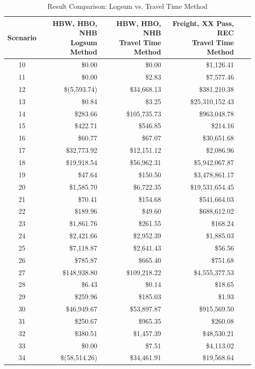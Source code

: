 \begin{table}

\caption{\label{tab:comparison} Result Comparison: Logsum vs. Travel Time Method}
\centering
\begin{tabular}[t]{crrrrr}
\toprule
Scenario & \makecell{HBW, HBO, NHB \\ Logsum Method} & \makecell{HBW, HBO, NHB\\ Travel Time Method} & \makecell{Freight, XX Pass, REC\\ Travel Time Method}\\
\midrule
10 & \$0.00 & \$0.00 & \$1,126.41\\
11 & \$0.00 & \$2.83 & \$7,577.46\\
12 & \$(5,593.74) & \$34,668.13 & \$381,210.38\\
13 & \$0.84 & \$3.25 & \$25,310,152.43\\
14 & \$283.66 & \$105,735.73 & \$963,048.78\\
15 & \$422.71 & \$546.85 & \$214.16\\
16 & \$60.77 & \$67.07 & \$30,651.68\\
17 & \$32,773.92 & \$12,151.12 & \$2,086.96\\
18 & \$19,918.54 & \$56,962.31 & \$5,942,067.87\\
19 & \$47.64 & \$150.50 & \$3,478,861.17\\
20 & \$1,585.70 & \$6,722.35 & \$19,531,654.45\\
21 & \$70.41 & \$154.68 & \$541,664.03\\
22 & \$189.96 & \$49.60 & \$688,612.02\\
23 & \$1,861.76 & \$261.55 & \$168.24\\
24 & \$2,421.66 & \$2,952.39 & \$1,885.03\\
25 & \$7,118.87 & \$2,641.43 & \$56.56\\
26 & \$785.87 & \$665.40 & \$751.68\\
27 & \$148,938.80 & \$109,218.22 & \$4,555,377.53\\
28 & \$6.43 & \$0.14 & \$18.65\\
29 & \$259.96 & \$185.03 & \$1.93\\
30 & \$46,949.67 & \$53,897.87 & \$915,569.50\\
31 & \$250.67 & \$965.35 & \$260.08\\
32 & \$380.51 & \$1,457.39 & \$48,530.21\\
33 & \$0.00 & \$7.51 & \$4,113.02\\
34 & \$(58,514.26) & \$34,461.91 & \$19,568.64\\

\end{tabular}
\end{table}
